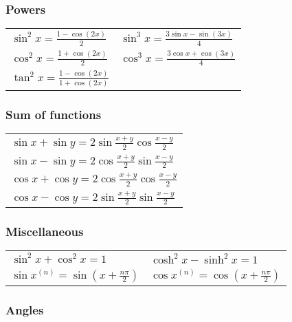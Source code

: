 \documentclass[a4paper, 10pt]{article}
\theoremstyle{definition}
\theoremstyle{ex}
\theoremstyle{named}
\begin{document}
\subsubsection*{Powers}
\begin{tabularx}{\linewidth}{XX}
    $\sin^2 x = \frac{1 - \cos(2x)}{2}$ & $\sin^3 x = \frac{3 \sin x - \sin(3x)}{4}$ \\
    $\cos^2 x = \frac{1 + \cos(2x)}{2}$ & $\cos^3 x = \frac{3 \cos x + \cos(3x)}{4}$ \\
    $\tan^2 x = \frac{1 - \cos(2x)}{1 + \cos(2x)}$
\end{tabularx}

\subsubsection*{Sum of functions}
\begin{tabularx}{\linewidth}{X}
    $\sin x + \sin y = 2 \sin\frac{x + y}{2} \cos\frac{x - y}{2}$ \\
    $\sin x - \sin y = 2 \cos\frac{x + y}{2} \sin\frac{x - y}{2}$ \\
    $\cos x + \cos y = 2 \cos\frac{x + y}{2} \cos\frac{x - y}{2}$ \\
    $\cos x - \cos y = 2 \sin\frac{x + y}{2} \sin\frac{x - y}{2}$
\end{tabularx}

\subsubsection*{Miscellaneous}
\begin{tabularx}{\linewidth}{XX}
    $\sin^2 x + \cos^2 x = 1$ & $\cosh^2 x - \sinh^2 x = 1$ \\
    $\sin x^{(n)} = \sin\left(x + \frac{n \pi}{2}\right)$ & $\cos x^{(n)} = \cos\left(x + \frac{n \pi}{2}\right)$ \\
\end{tabularx}

\subsubsection*{Angles}
\end{document}
